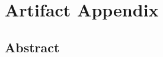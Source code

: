 \documentclass[sigconf]{acmart}
\begin{document}
	
	
	
	
	
	\appendix
	
	\section{Artifact Appendix}
	
%	
	
	
	\subsection{Abstract}


\end{document}
